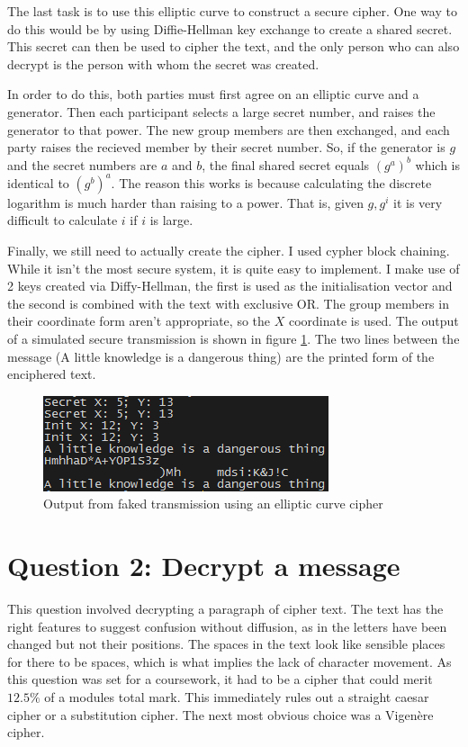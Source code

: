 \documentclass[12pt]{article}
\begin{document}
The last task is to use this elliptic curve to construct a secure cipher. One way to do this would be by using Diffie-Hellman key exchange to create a shared secret. This secret can then be used to cipher the text, and the only person who can also decrypt is the person with whom the secret was created.

In order to do this, both parties must first agree on an elliptic curve and a generator. Then each participant selects a large secret number, and raises the generator to that power. The new group members are then exchanged, and each party raises the recieved member by their secret number. So, if the generator is $g$ and the secret numbers are $a$ and $b$, the final shared secret equals $(g^a)^b$ which is identical to $(g^b)^a$. The reason this works is because calculating the discrete logarithm is much harder than raising to a power. That is, given $g, g^i$ it is very difficult to calculate $i$ if $i$ is large.

Finally, we still need to actually create the cipher. I used cypher block chaining. While it isn't the most secure system, it is quite easy to implement. I make use of 2 keys created via Diffy-Hellman, the first is used as the initialisation vector and the second is combined with the text with exclusive OR. The group members in their coordinate form aren't appropriate, so the $X$ coordinate is used. The output of a simulated secure transmission is shown in figure \ref{fig:output}. The two lines between the message (A little knowledge is a dangerous thing) are the printed form of the enciphered text.

\begin{figure}[!h]
\label{fig:output}
\centering
\includegraphics[keepaspectratio=true]{qOneOutput}
\caption{Output from faked transmission using an elliptic curve cipher}
\end{figure}

\section{Question 2: Decrypt a message}

This question involved decrypting a paragraph of cipher text. The text has the right features to suggest confusion without diffusion, as in the letters have been changed but not their positions. The spaces in the text look like sensible places for there to be spaces, which is what implies the lack of character movement. As this question was set for a coursework, it had to be a cipher that could merit $12.5\%$ of a modules total mark. This immediately rules out a straight caesar cipher or a substitution cipher. The next most obvious choice was a Vigen\`ere cipher.
\end{document}
